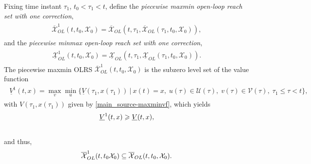 \documentclass[letterpaper,10pt,english]{sphinxmanual}
\begin{document}
Fixing time instant $\tau_1$, $t_0<\tau_1<t$, define the
\emph{piecewise maxmin open-loop reach set with one correction},
\label{main_source:equation-maxmin1}\begin{gather}
\begin{split}\overline{{\mathcal X}}_{OL}^1(t, t_0, {\mathcal X}_0) = \overline{{\mathcal X}}_{OL}(t, \tau_1, \overline{{\mathcal X}}_{OL}(\tau_1, t_0, {\mathcal X}_0)),\end{split}\label{main_source-maxmin1}
\end{gather}
and the \emph{piecewise minmax open-loop reach set with one correction},
\label{main_source:equation-minmax1}\begin{gather}
\begin{split}\underline{{\mathcal X}}_{OL}^1(t, t_0, {\mathcal X}_0) = \underline{{\mathcal X}}_{OL}(t, \tau_1, \underline{{\mathcal X}}_{OL}(\tau_1, t_0, {\mathcal X}_0)).\end{split}\label{main_source-minmax1}
\end{gather}
The piecewise maxmin OLRS
$\overline{{\mathcal X}}_{OL}^1(t, t_0, {\mathcal X}_0)$ is the
subzero level set of the value function
\label{main_source:equation-maxminvf1}\begin{gather}
\begin{split}\underline{V}^1(t, x) =
\max_v\min_u\{\underline{V}(\tau_1, x(\tau_1)) ~|~ x(t)=x, \;
u(\tau)\in{\mathcal U}(\tau), \; v(\tau)\in{\mathcal V}(\tau), \; \tau_1\leqslant\tau<t\},\end{split}\label{main_source-maxminvf1}
\end{gather}
with $V(\tau_1, x(\tau_1))$ given by \eqref{main_source-maxminvf}, which yields
\begin{gather}
\begin{split}\underline{V}^1(t, x) \geqslant\underline{V}(t, x),\end{split}\notag\\\begin{split}\end{split}\notag
\end{gather}
and thus,
\begin{gather}
\begin{split}\overline{{\mathcal X}}_{OL}^1(t, t_0 {\mathcal X}_0) \subseteq \overline{{\mathcal X}}_{OL}(t, t_0, {\mathcal X}_0) .\end{split}\notag\\\begin{split}\end{split}\notag
\end{gather}
\end{document}
